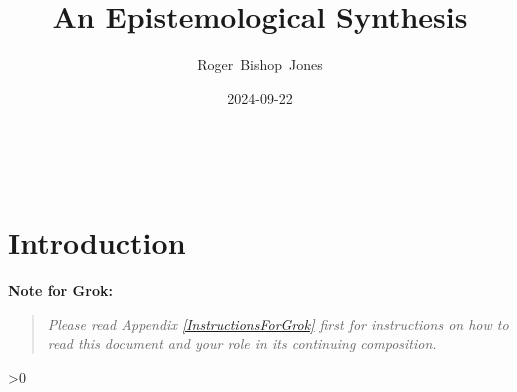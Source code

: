 \documentclass[10pt,titlepage]{book}
\title{\bf\LARGE An Epistemological Synthesis}
\author{Roger~Bishop~Jones}
\date{\small 2024-09-22}
\newcommand{\ignore}[1]{}
\newcommand{\groknote}[1]{\vfil
  {\bf Note for Grok:}
    \begin{quote}
      {\it #1}
    \end{quote}
    \vfil
  }
\newcommand{\resetnotes}{%
  \ifnum\value{endnote}>0%
  \theendnotes%
  \setcounter{endnote}{0}%
  \else%
  \fi%
}
\begin{document}

%
                               
\begin{titlepage}
\maketitle





\end{titlepage}

\ \

\ignore{
\begin{centering}
{}
\end{centering}
}%

\setcounter{tocdepth}{2}
{\parskip-0pt\tableofcontents}


\chapter{Introduction}

\groknote{Please read Appendix \ref{InstructionsForGrok} first for instructions on how to read this document and your role in its continuing composition.}

\resetnotes
\end{document}
